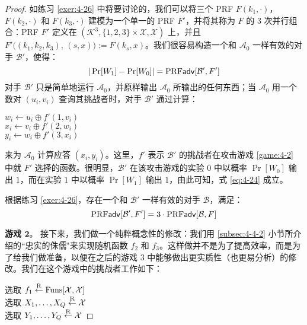 \begin{proof}
如练习 \ref{exer:4-26} 中将要讨论的，我们可以将三个 PRF $F(k_1,\cdot)$，$F(k_2,\cdot)$ 和 $F(k_3,\cdot)$ 建模为一个单一的 PRF $F'$，并将其称为 $F$ 的 $3$ 次并行组合：PRF $F'$ 定义在 $(\mathcal{K}^3,\{1,2,3\}\times\mathcal{X},\mathcal{X})$ 上，并且 $F'\big((k_1,k_2,k_3),\,(s,x)\big):=F(k_s,x)$。我们很容易构造一个和 $\mathcal{A}_0$ 一样有效的对手 $\mathcal{B}'$，使得：
\begin{equation}\label{eq:4-24}
|\Pr[W_1]-\Pr[W_0]|={\rm PRF\mathsf{adv}}[\mathcal{B}', F']
\end{equation}
对手 $\mathcal{B}'$ 只是简单地运行 $\mathcal{A}_0$，并原样输出 $\mathcal{A}_0$ 所输出的任何东西；当 $\mathcal{A}_0$ 用一个数对 $(u_i,v_i)$ 查询其挑战者时，对手 $\mathcal{B}'$ 通过计算：

\vspace{10pt}

\hspace*{5pt} $w_i\leftarrow u_i\oplus f'(1,v_i)$\\
\hspace*{26pt} $x_i\leftarrow v_i\oplus f'(2,w_i)$\\
\hspace*{26pt} $y_i\leftarrow w_i\oplus f'(3,x_i)$

\vspace{10pt}

\noindent
来为 $\mathcal{A}_0$ 计算应答 $(x_i,y_i)$。这里，$f'$ 表示 $\mathcal{B}'$ 的挑战者在攻击游戏 \ref{game:4-2} 中就 $F'$ 选择的函数。很明显，$\mathcal{B}'$ 在该攻击游戏的实验 $0$ 中以概率 $\Pr[W_0]$ 输出 $1$，而在实验 $1$ 中以概率 $\Pr[W_1]$ 输出 $1$，由此可知，式 \ref{eq:4-24} 成立。

根据练习 \ref{exer:4-26}，存在一个和 $\mathcal{B}'$ 一样有效的对手 $\mathcal{B}$，满足：
\begin{equation}\label{eq:4-25}
{\rm PRF\mathsf{adv}}[\mathcal{B}', F']= 3\cdot {\rm PRF\mathsf{adv}}[\mathcal{B}, F]
\end{equation}

\noindent
\textbf{游戏 $\mathbf{2}$}。
接下来，我们做一个纯粹概念性的修改：我们用 \ref{subsec:4-4-2} 小节所介绍的``忠实的侏儒"来实现随机函数 $f_2$ 和 $f_3$。这样做并不是为了提高效率，而是为了给我们做准备，以便在之后的游戏 $3$ 中能够做出更实质性（也更易分析）的修改。我们在这个游戏中的挑战者工作如下：

\vspace{10pt}

\hspace*{5pt} 选取 $f_1\overset{\rm R}\leftarrow{\rm Funs}[\mathcal{X},\mathcal{X}]$\\
\hspace*{26pt} 选取 $X_1,\dots,X_Q\overset{\rm R}\leftarrow\mathcal{X}$\\
\hspace*{26pt} 选取 $Y_1,\dots,Y_Q\overset{\rm R}\leftarrow\mathcal{X}$


\end{proof}
